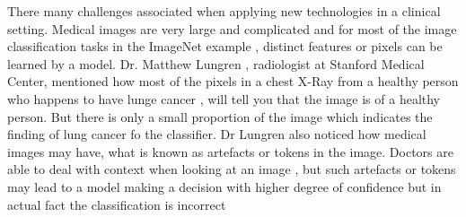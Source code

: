 There many challenges associated when applying new technologies in a clinical setting. Medical images are very large and complicated and for most of the image classification tasks in the ImageNet example , distinct features or pixels can be learned by a model. Dr. Matthew Lungren , radiologist at Stanford Medical Center, mentioned how most of the pixels in a chest X-Ray from a healthy person who happens to have lunge cancer , will tell you that the image is of a healthy person. But there is only a small proportion of the image which indicates the finding of lung cancer fo the classifier. Dr Lungren also noticed how medical images may have, what is known as artefacts or tokens in the image. Doctors are able to deal with context when looking at an image , but such artefacts or tokens may lead to a model making a decision with higher degree of confidence but in actual fact the classification is incorrect \cite{DrLungren.2018}

